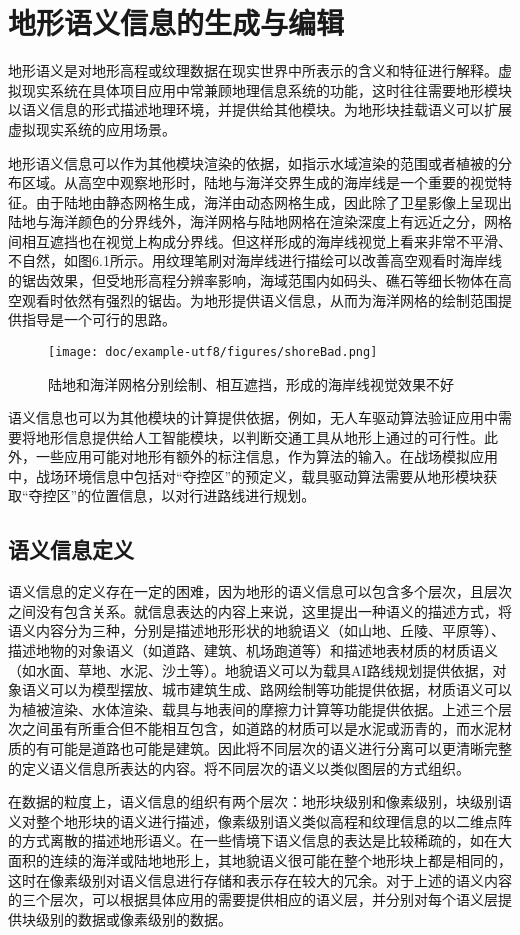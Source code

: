 
\chapter{地形语义信息的生成与编辑}
地形语义是对地形高程或纹理数据在现实世界中所表示的含义和特征进行解释。虚拟现实系统在具体项目应用中常兼顾地理信息系统的功能\supercite{沈敬伟}，这时往往需要地形模块以语义信息的形式描述地理环境，并提供给其他模块。为地形块挂载语义可以扩展虚拟现实系统的应用场景。\par
地形语义信息可以作为其他模块渲染的依据，如指示水域渲染的范围或者植被的分布区域。从高空中观察地形时，陆地与海洋交界生成的海岸线是一个重要的视觉特征。由于陆地由静态网格生成，海洋由动态网格生成，因此除了卫星影像上呈现出陆地与海洋颜色的分界线外，海洋网格与陆地网格在渲染深度上有远近之分，网格间相互遮挡也在视觉上构成分界线。但这样形成的海岸线视觉上看来非常不平滑、不自然，如图6.1所示。用纹理笔刷对海岸线进行描绘可以改善高空观看时海岸线的锯齿效果，但受地形高程分辨率影响，海域范围内如码头、礁石等细长物体在高空观看时依然有强烈的锯齿。为地形提供语义信息，从而为海洋网格的绘制范围提供指导是一个可行的思路。\par
\begin{figure}[H]
    \centering
    \texttt{[image: doc/example-utf8/figures/shoreBad.png]}
    \caption{陆地和海洋网格分别绘制、相互遮挡，形成的海岸线视觉效果不好}
\end{figure}
语义信息也可以为其他模块的计算提供依据，例如，无人车驱动算法验证应用中需要将地形信息提供给人工智能模块，以判断交通工具从地形上通过的可行性。此外，一些应用可能对地形有额外的标注信息，作为算法的输入。在战场模拟应用中，战场环境信息中包括对“夺控区”的预定义，载具驱动算法需要从地形模块获取“夺控区”的位置信息，以对行进路线进行规划。
\section{语义信息定义}
语义信息的定义存在一定的困难，因为地形的语义信息可以包含多个层次，且层次之间没有包含关系。就信息表达的内容上来说，这里提出一种语义的描述方式，将语义内容分为三种，分别是描述地形形状的地貌语义（如山地、丘陵、平原等）、描述地物的对象语义（如道路、建筑、机场跑道等）和描述地表材质的材质语义（如水面、草地、水泥、沙土等）。地貌语义可以为载具AI路线规划提供依据，对象语义可以为模型摆放、城市建筑生成、路网绘制等功能提供依据，材质语义可以为植被渲染、水体渲染、载具与地表间的摩擦力计算等功能提供依据。上述三个层次之间虽有所重合但不能相互包含，如道路的材质可以是水泥或沥青的，而水泥材质的有可能是道路也可能是建筑。因此将不同层次的语义进行分离可以更清晰完整的定义语义信息所表达的内容。将不同层次的语义以类似图层的方式组织。\par
在数据的粒度上，语义信息的组织有两个层次：地形块级别和像素级别，块级别语义对整个地形块的语义进行描述，像素级别语义类似高程和纹理信息的以二维点阵的方式离散的描述地形语义。在一些情境下语义信息的表达是比较稀疏的，如在大面积的连续的海洋或陆地地形上，其地貌语义很可能在整个地形块上都是相同的，这时在像素级别对语义信息进行存储和表示存在较大的冗余。对于上述的语义内容的三个层次，可以根据具体应用的需要提供相应的语义层，并分别对每个语义层提供块级别的数据或像素级别的数据。\par
